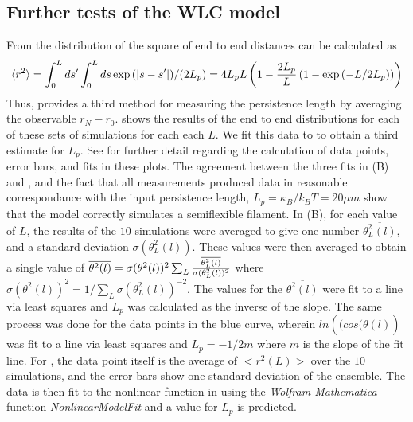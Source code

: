 \documentclass[11pt]{article}
\begin{document}
\subsection{ Further tests of the WLC model }\label{lpCalc}
From  the distribution of the square of end to end distances can be calculated as 
\begin{equation}
  \langle r^2\rangle=\int_0^L{ds'}\int_0^L{ds \exp{(|s-s'|)/(2L_p)}}=4L_p L\left( 1-{2L_p\over L}\left( 1-\exp{(-L/2L_p)} \right) \right)
  \label{eqn:r2}
\end{equation} 
Thus,  provides a third method for measuring the persistence length by
averaging the observable $r_N-r_0$.
 shows the results of the end to end distributions for each of these sets of simulations for each each $L$.  
We fit this data to  to obtain a third estimate for $L_p$. 
See  for further detail regarding the calculation of data points, error bars, and fits in these plots.  
The agreement between the three fits in (B) and , and the
fact that all measurements produced data in reasonable correspondance with the input persistence length, $L_p =
\kappa_B/k_BT = 20\mu m$ show that the model correctly simulates a semiflexible filament. 
In (B), for each value of $L$, the results of the $10$ simulations were averaged to 
give one number $\overline{\theta^2_L(l)}$, and a standard deviation $\sigma(\theta^2_L(l))$. These values were then averaged 
to obtain a single value of $\overline{\theta^2(l)} = \sigma(\theta^2(l))^2\sum_L{\overline{\theta^2_L(l)}\over\sigma(\theta^2_L(l))^2}$ where
$\sigma(\theta^2(l))^2 = 1/\sum_L{\sigma(\theta^2_L(l))^{-2}}$. The values for the $\overline{\theta^2(l)}$ were fit to
a line via least squares and $L_p$ was calculated as the inverse of the slope. The same process was done for the data points in the
blue curve, wherein $ln(\overline{(cos(\theta(l)})$ was fit to a line via least squares and $L_p = -1/2m$ where $m$ is the
slope of the fit line. For , the data point itself is the average of $<r^2(L)>$ over the $10$ simulations, 
and the error bars show one standard deviation of
the ensemble. The data is then fit to the nonlinear function in  using the \textit{Wolfram Mathematica} function  
\textit{NonlinearModelFit} and a value for $L_p$ is predicted. 
\end{document}
